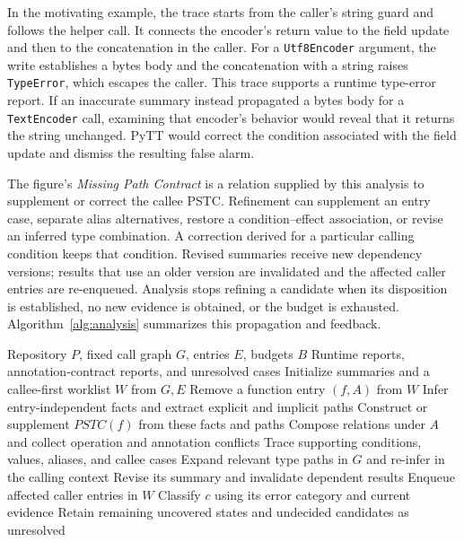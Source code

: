 In the motivating example, the trace starts from the caller's string
guard and follows the helper call. It connects the encoder's return value
to the field update and then to the concatenation in the caller.
For a \texttt{Utf8Encoder} argument, the write establishes a
bytes body and the concatenation with a string raises \texttt{TypeError},
which escapes the caller. This trace supports a runtime type-error report.
If an inaccurate summary instead propagated a bytes body for a
\texttt{TextEncoder} call, examining that encoder's behavior would reveal
that it returns the string unchanged. PyTT would correct the condition
associated with the field update and dismiss the resulting false alarm.

The figure's \emph{Missing Path Contract} is a relation supplied by this
analysis to supplement or correct the callee PSTC. Refinement can
supplement an entry case, separate alias alternatives,
restore a condition--effect association, or revise an inferred type
combination. A correction derived for a particular calling condition keeps
that condition. Revised summaries receive new dependency versions; results
that use an older version are invalidated and the affected caller entries
are re-enqueued. Analysis stops refining a candidate when its disposition
is established, no new evidence is obtained, or the budget is exhausted.
Algorithm~\ref{alg:analysis} summarizes this propagation and feedback.

\begin{algorithm}[t]
\caption{Propagation with conflict-driven relation refinement}
\label{alg:analysis}
\begin{algorithmic}[1]
\Require Repository $P$, fixed call graph $G$, entries $E$, budgets $B$
\Ensure Runtime reports, annotation-contract reports, and unresolved cases
\State Initialize summaries and a callee-first worklist $W$ from $G,E$
  \State Remove a function entry $(f,A)$ from $W$
  \State Infer entry-independent facts and extract explicit and implicit paths
  \State Construct or supplement $\mathit{PSTC}(f)$ from these facts and paths
  \State Compose relations under $A$ and collect operation and annotation conflicts
    \State Trace supporting conditions, values, aliases, and callee cases
    \State Expand relevant type paths in $G$ and re-infer in the calling context
      \State Revise its summary and invalidate dependent results
      \State Enqueue affected caller entries in $W$
    \EndIf
    \State Classify $c$ using its error category and current evidence
  \EndFor
\EndWhile
\State Retain remaining uncovered states and undecided candidates as unresolved
\end{algorithmic}
\end{algorithm}


